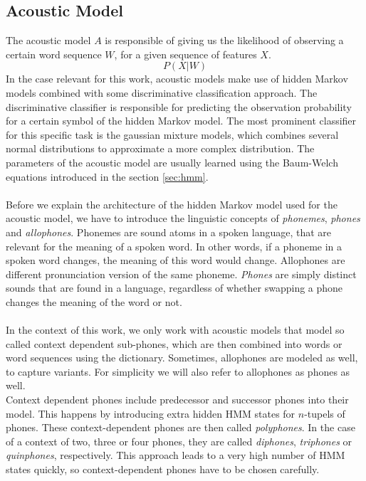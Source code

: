 
\subsection{Acoustic Model}
\label{sec:acoustic_model}
The acoustic model $A$ is responsible of giving us the likelihood of observing a certain word sequence $W$, for a given sequence of features $X$. 
\[
	P(X|W)
\]
In the case relevant for this work, acoustic models make use of hidden Markov models combined with some discriminative classification approach. The discriminative classifier is responsible for predicting the observation probability for a certain symbol of the hidden Markov model. The most prominent classifier for this specific task is the gaussian mixture models, which combines several normal distributions to approximate a more complex distribution. The parameters of the acoustic model are usually learned using the Baum-Welch equations introduced in the section \ref{sec:hmm}. \\ \\
Before we explain the architecture of the hidden Markov model used for the acoustic model, we have to introduce the linguistic concepts of \textit{phonemes}, \textit{phones} and \textit{allophones}. Phonemes are sound atoms in a spoken language, that are relevant for the meaning of a spoken word. In other words, if a phoneme in a spoken word changes, the meaning of this word would change. Allophones are different pronunciation version of the same phoneme. \textit{Phones} are simply distinct sounds that are found in a language, regardless of whether swapping a phone changes the meaning of the word or not. \\ \\
In the context of this work, we only work with acoustic models that model so called context dependent sub-phones, which are then combined into words or word sequences using the dictionary. Sometimes, allophones are modeled as well, to capture variants. For simplicity we will also refer to allophones as phones as well. \\
Context dependent phones include predecessor and successor phones into their model. This happens by introducing extra hidden HMM states for $n$-tupels of phones. These context-dependent phones are then called \textit{polyphones}. In the case of a context of two, three or four phones, they are called \textit{diphones}, \textit{triphones} or \textit{quinphones}, respectively. This approach leads to a very high number of HMM states quickly, so context-dependent phones have to be chosen carefully. \\
